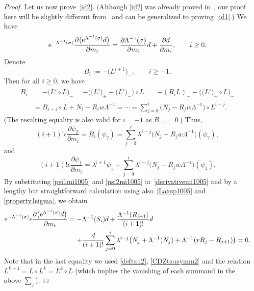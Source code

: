 \documentclass[11pt]{article}
\numberwithin{equation}{section}
\newcommand{\e}{\epsilon}
\newcommand{\p}{\partial}
\newcommand{\nn}{\nonumber}
\newcommand{\beq}{\begin{equation}}
\newcommand{\eeq}{\end{equation}}
\numberwithin{equation}{section}
\begin{document}
\begin{proof}
Let us now prove~\eqref{id2}. (Although \eqref{id2} was already proved in~\cite{Y},
our proof here will be slightly different from~\cite{Y} and can be generalized to proving~\eqref{id1}.)
We have
\beq\label{derivativemi1005}
{\rm e}^{-\Lambda^{-1}(\sigma)}\frac{\p \bigl({\rm e}^{\Lambda^{-1}(\sigma)}d\bigr)}{\p m_i}
= \frac{\p \Lambda^{-1}(\sigma)}{\p m_i} d + \frac{\p d}{\p m_i}, \qquad i\ge0.
\eeq
Denote
\[
B_i:= -\bigl(L^{i+1}\bigr)_-, \qquad i\ge-1.
\]
Then for all $i\ge0$, we have
\begin{align*}
B_i & = -\bigl(L^i\circ L\bigr)_- = - \bigl(\bigl(L^i\bigr)_+ + \bigl(L^i\bigr)_-\bigr) \circ L_-
 = - (R_i L)_- - \bigl(\bigl(L^i\bigr)_- \circ L\bigr)_- \nn\\
& = B_{i-1} \circ L + N_i - R_i w \Lambda^{-1} = \cdots
 = \sum_{j=0}^i \bigl(N_j-R_j w\Lambda^{-1}\bigr) \circ L^{i-j}. \nn
\end{align*}
(The resulting equality is also valid for $i=-1$ as $B_{-1}=0$.)
Thus,
\beq\label{psi2mi1005}
(i+1)! \e \frac{\p \psi_2}{\p m_i} = B_i (\psi_2) = \sum_{j=0}^i \lambda^{i-j} \bigl(N_j-R_j w\Lambda^{-1}\bigr) (\psi_2),
\eeq
and
\beq\label{psi1mi1005}
(i+1)! \e \frac{\p \psi_1}{\p m_i} %
=\lambda^{i+1} \psi_1
+ \sum_{j=0}^i \lambda^{i-j} \bigl(N_j-R_j w\Lambda^{-1}\bigr) (\psi_1).
\eeq
By substituting \eqref{psi1mi1005} and \eqref{psi2mi1005} in~\eqref{derivativemi1005}
and by a lengthy but straightforward calculation using also~\eqref{Laxsp1005} and \eqref{property1sigma}, we obtain
\begin{align*}
{\rm e}^{-\Lambda^{-1}(\sigma)} \e\frac{\p \bigl({\rm e}^{\Lambda^{-1}(\sigma)}d\bigr)}{\p m_i}
={}& {-}{} \Lambda^{-1}(S_{i}) d
+ \frac{\Lambda^{-1}(R_{i+1})}{(i+1)!} d \nn\\
&{}{+}{} \frac{d}{(i+1)!}\sum_{j=0}^i \lambda^{i-j} \bigl(N_j+\Lambda^{-1}(N_j)+\Lambda^{-1}(v R_j-R_{j+1})\bigr) = 0. \nn
\end{align*}
Note that in the last equality we used \eqref{deftau2}, \eqref{CDZtausymm2}
and the relation $L^{k+1}=L\circ L^k=L^k \circ L$ (which implies the vanishing of each
summand in the above $\sum_j$).


\end{proof}
\end{document}
